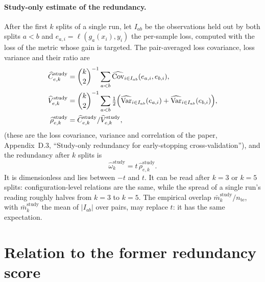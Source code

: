 \documentclass[11pt]{article}
\begin{document}
\paragraph{Study-only estimate of the redundancy.}
After the first $k$ splits of a single run, let $I_{ab}$ be the observations held out by both
splits $a<b$ and $e_{a,i} = \ell(g_a(x_i), y_i)$ the per-sample loss, computed with the loss of
the metric whose gain is targeted. The pair-averaged loss covariance, loss variance and their
ratio are
\begin{align}
  \widehat C^{\mathrm{study}}_{e,k}
  &= \binom{k}{2}^{-1} \sum_{a<b} \widehat{\operatorname{Cov}}_{i\in I_{ab}}(e_{a,i},e_{b,i}), \\
  \widehat V^{\mathrm{study}}_{e,k}
  &= \binom{k}{2}^{-1} \sum_{a<b} \tfrac{1}{2}\Bigl(
      \widehat{\operatorname{Var}}_{i\in I_{ab}}(e_{a,i}) + \widehat{\operatorname{Var}}_{i\in I_{ab}}(e_{b,i})\Bigr), \\
  \widehat\rho^{\mathrm{study}}_{e,k} &= \widehat C^{\mathrm{study}}_{e,k} / \widehat V^{\mathrm{study}}_{e,k},
\end{align}
(these are the loss covariance, variance and correlation of the paper, Appendix~D.3,
``Study-only redundancy for early-stopping cross-validation''), and the redundancy after $k$ splits is
\begin{equation}
  \widehat\omega^{\mathrm{study}}_{k} = t\, \widehat\rho^{\mathrm{study}}_{e,k}.
  \label{eq:omega-hat}
\end{equation}
It is dimensionless and lies between $-t$ and $t$. It can be read after $k = 3$ or $k = 5$ splits:
configuration-level relations are the same, while the spread of a single run's reading roughly
halves from $k = 3$ to $k = 5$.
The empirical overlap $\bar m^{\mathrm{study}}_k / n_{\text{te}}$, with
$\bar m^{\mathrm{study}}_k$ the mean of $|I_{ab}|$ over pairs, may replace $t$: it has the same
expectation.

\section{Relation to the former redundancy score}
\end{document}
